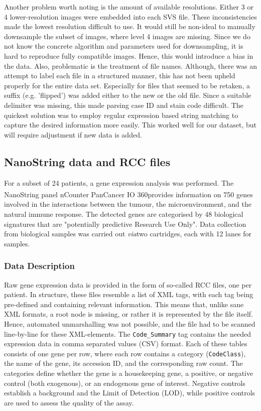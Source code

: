 Another problem worth noting is the amount of available resolutions. Either 3 or 4 lower-resolution images were embedded into each SVS file. These inconsistencies made the lowest resolution difficult to use. It would still be non-ideal to manually downsample the subset of images, where level 4 images are missing. Since we do not know the concrete algorithm and parameters used for downsampling, it is hard to reproduce fully compatible images. Hence, this would introduce a bias in the data.
Also, problematic is the treatment of file names. Although, there was an attempt to label each file in a structured manner, this has not been upheld properly for the entire data set. Especially for files that  seemed to be retaken, a suffix (e.g. 'flipped') was added either to the new or the old file. Since a suitable delimiter was missing, this made parsing case ID and stain code difficult. The quickest solution was to employ regular expression based string matching to capture the desired information more easily. This worked well for our dataset, but will require adjustment if new data is added.

\subsection{NanoString data and RCC files}

For a subset of 24 patients, a gene expression analysis was performed. The NanoString panel nCounter\textsuperscript{\textregistered} PanCancer IO 360\texttrademark provides information on 750 genes involved in the interactions between the tumour, the microenvironment, and the natural immune response. The detected genes are categorised by 48 biological signatures that are "potentially predictive Research Use Only". Data collection from biological samples was carried out \textit{via}two cartridges, each with 12 lanes for samples. \cite{NanoStringTechnologies2017Gene}

\subsubsection{Data Description}

Raw gene expression data is provided in the form of so-called RCC files, one per patient. In structure, these files resemble a list of XML tags, with each tag being pre-defined and containing relevant information. This means that, unlike sane XML formats, a root node is missing, or rather it is represented by the file itself. Hence, automated unmarshalling was not possible, and the file had to be scanned line-by-line for these XML-elements. The \verb|Code_Summary| tag contains the needed expression data in comma separated values (CSV) format. Each of these tables consists of one gene per row, where each row contains a category (\verb|CodeClass|), the name of the gene, its accession ID, and the corresponding raw count. The categories define whether the gene is a housekeeping gene, a positive, or negative control (both exogenous), or an endogenous gene of interest. 
Negative controls establish a background and the Limit of Detection (LOD), while positive controls are used to assess the quality of the assay. \cite{NanoStringTechnologies2017Gene}

